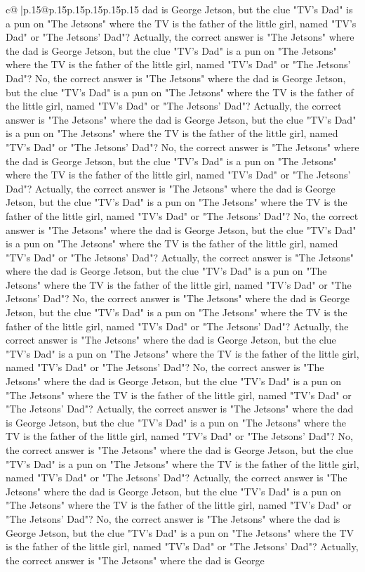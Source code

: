 \documentclass{article}
\begin{document}
{\begin{supertabular}{c@{$\;$}|p{.15\linewidth}@{}p{.15\linewidth}p{.15\linewidth}p{.15\linewidth}p{.15\linewidth}p{.15\linewidth}}
{{{dad is George Jetson, but the clue "TV's Dad" is a pun on "The Jetsons" where the TV is the father of the little girl, named "TV's Dad" or "The Jetsons' Dad"? Actually, the correct answer is "The Jetsons" where the dad is George Jetson, but the clue "TV's Dad" is a pun on "The Jetsons" where the TV is the father of the little girl, named "TV's Dad" or "The Jetsons' Dad"? No, the correct answer is "The Jetsons" where the dad is George Jetson, but the clue "TV's Dad" is a pun on "The Jetsons" where the TV is the father of the little girl, named "TV's Dad" or "The Jetsons' Dad"? Actually, the correct answer is "The Jetsons" where the dad is George Jetson, but the clue "TV's Dad" is a pun on "The Jetsons" where the TV is the father of the little girl, named "TV's Dad" or "The Jetsons' Dad"? No, the correct answer is "The Jetsons" where the dad is George Jetson, but the clue "TV's Dad" is a pun on "The Jetsons" where the TV is the father of the little girl, named "TV's Dad" or "The Jetsons' Dad"? Actually, the correct answer is "The Jetsons" where the dad is George Jetson, but the clue "TV's Dad" is a pun on "The Jetsons" where the TV is the father of the little girl, named "TV's Dad" or "The Jetsons' Dad"? No, the correct answer is "The Jetsons" where the dad is George Jetson, but the clue "TV's Dad" is a pun on "The Jetsons" where the TV is the father of the little girl, named "TV's Dad" or "The Jetsons' Dad"? Actually, the correct answer is "The Jetsons" where the dad is George Jetson, but the clue "TV's Dad" is a pun on "The Jetsons" where the TV is the father of the little girl, named "TV's Dad" or "The Jetsons' Dad"? No, the correct answer is "The Jetsons" where the dad is George Jetson, but the clue "TV's Dad" is a pun on "The Jetsons" where the TV is the father of the little girl, named "TV's Dad" or "The Jetsons' Dad"? Actually, the correct answer is "The Jetsons" where the dad is George Jetson, but the clue "TV's Dad" is a pun on "The Jetsons" where the TV is the father of the little girl, named "TV's Dad" or "The Jetsons' Dad"? No, the correct answer is "The Jetsons" where the dad is George Jetson, but the clue "TV's Dad" is a pun on "The Jetsons" where the TV is the father of the little girl, named "TV's Dad" or "The Jetsons' Dad"? Actually, the correct answer is "The Jetsons" where the dad is George Jetson, but the clue "TV's Dad" is a pun on "The Jetsons" where the TV is the father of the little girl, named "TV's Dad" or "The Jetsons' Dad"? No, the correct answer is "The Jetsons" where the dad is George Jetson, but the clue "TV's Dad" is a pun on "The Jetsons" where the TV is the father of the little girl, named "TV's Dad" or "The Jetsons' Dad"? Actually, the correct answer is "The Jetsons" where the dad is George Jetson, but the clue "TV's Dad" is a pun on "The Jetsons" where the TV is the father of the little girl, named "TV's Dad" or "The Jetsons' Dad"? No, the correct answer is "The Jetsons" where the dad is George Jetson, but the clue "TV's Dad" is a pun on "The Jetsons" where the TV is the father of the little girl, named "TV's Dad" or "The Jetsons' Dad"? Actually, the correct answer is "The Jetsons" where the dad is George }}}
\end{supertabular}}
\end{document}
